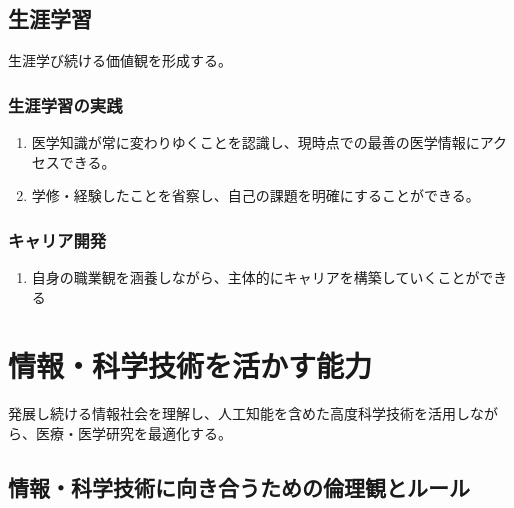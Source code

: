 \documentclass[
]{ltjsarticle}
\providecommand{\tightlist}{%
  \setlength{\itemsep}{0pt}\setlength{\parskip}{0pt}}
\begin{document}
\hypertarget{ux751fux6dafux5b66ux7fd2}{%
\subsection{生涯学習}\label{ux751fux6dafux5b66ux7fd2}}

生涯学び続ける価値観を形成する。

\hypertarget{ux751fux6dafux5b66ux7fd2ux306eux5b9fux8df5}{%
\subsubsection{生涯学習の実践}\label{ux751fux6dafux5b66ux7fd2ux306eux5b9fux8df5}}

\begin{enumerate}
\def\labelenumi{\arabic{enumi}.}
\tightlist
\item
  医学知識が常に変わりゆくことを認識し、現時点での最善の医学情報にアクセスできる。
\item
  学修・経験したことを省察し、自己の課題を明確にすることができる。
\end{enumerate}

\hypertarget{ux30adux30e3ux30eaux30a2ux958bux767a}{%
\subsubsection{キャリア開発}\label{ux30adux30e3ux30eaux30a2ux958bux767a}}

\begin{enumerate}
\def\labelenumi{\arabic{enumi}.}
\tightlist
\item
  自身の職業観を涵養しながら、主体的にキャリアを構築していくことができる
\end{enumerate}

\newpage

\hypertarget{ux60c5ux5831ux79d1ux5b66ux6280ux8853ux3092ux6d3bux304bux3059ux80fdux529b}{%
\section{情報・科学技術を活かす能力}\label{ux60c5ux5831ux79d1ux5b66ux6280ux8853ux3092ux6d3bux304bux3059ux80fdux529b}}

発展し続ける情報社会を理解し、人工知能を含めた高度科学技術を活用しながら、医療・医学研究を最適化する。

\hypertarget{ux60c5ux5831ux79d1ux5b66ux6280ux8853ux306bux5411ux304dux5408ux3046ux305fux3081ux306eux502bux7406ux89b3ux3068ux30ebux30fcux30eb}{%
\subsection{情報・科学技術に向き合うための倫理観とルール}\label{ux60c5ux5831ux79d1ux5b66ux6280ux8853ux306bux5411ux304dux5408ux3046ux305fux3081ux306eux502bux7406ux89b3ux3068ux30ebux30fcux30eb}}
\end{document}
